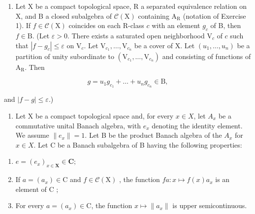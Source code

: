 \begin{enumerate}
\def\labelenumi{\arabic{enumi})}
\setcounter{enumi}{1}
\tightlist
\item
  Let X be a compact topological space, R a separated equivalence relation on X, and B a closed subalgebra of \(\mathcal{C}(\mathrm{X})\) containing \(\mathrm{A}_{\mathrm{R}}\) (notation of Exercise 1). If \(f \in \mathcal{C}(\mathrm{X})\) coincides on each R-class \(c\) with an element \(g_{c}\) of B, then \(f \in \mathrm{B}\). (Let \(\varepsilon > 0\). There exists a saturated open neighborhood \(\mathrm{V}_{c}\) of \(c\) such that \(|f - g_{c}| \leqslant \varepsilon\) on \(\mathrm{V}_{c}\). Let \(\mathrm{V}_{c_{1}}, \ldots, \mathrm{V}_{c_{n}}\) be a cover of X. Let \((u_{1}, \ldots, u_{n})\) be a partition of unity subordinate to \((\mathrm{V}_{c_{1}}, \ldots, \mathrm{V}_{c_{n}})\) and consisting of functions of \(\mathrm{A}_{\mathrm{R}}\). Then
\end{enumerate}

\[
g = u _ {1} g _ {c _ {1}} + \dots + u _ {n} g _ {c _ {n}} \in \mathrm{B},
\]

and \(|f - g| \leqslant \varepsilon\).)

\begin{enumerate}
\def\labelenumi{\arabic{enumi})}
\setcounter{enumi}{2}
\tightlist
\item
  Let X be a compact topological space and, for every \(x \in X\), let \(A_{x}\) be a commutative unital Banach algebra, with \(e_{x}\) denoting the identity element. We assume \(\|e_{x}\| = 1\). Let B be the product Banach algebra of the \(A_{x}\) for \(x \in X\). Let C be a Banach subalgebra of B having the following properties:
\end{enumerate}

\begin{enumerate}
\def\labelenumi{(\roman{enumi})}
\item
  \(e = (e_x)_{x \in \mathbf{X}} \in \mathbf{C};\)
\item
  If \(a = (a_x) \in \mathrm{C}\) and \(f \in \mathcal{C}(\mathrm{X})\) , the function \(fa: x \mapsto f(x)a_x\) is an element of \(\mathrm{C}\) ;
\item
  For every \(a = (a_x) \in \mathrm{C}\), the function \(x \mapsto \|a_x\|\) is upper semicontinuous.
\end{enumerate}

